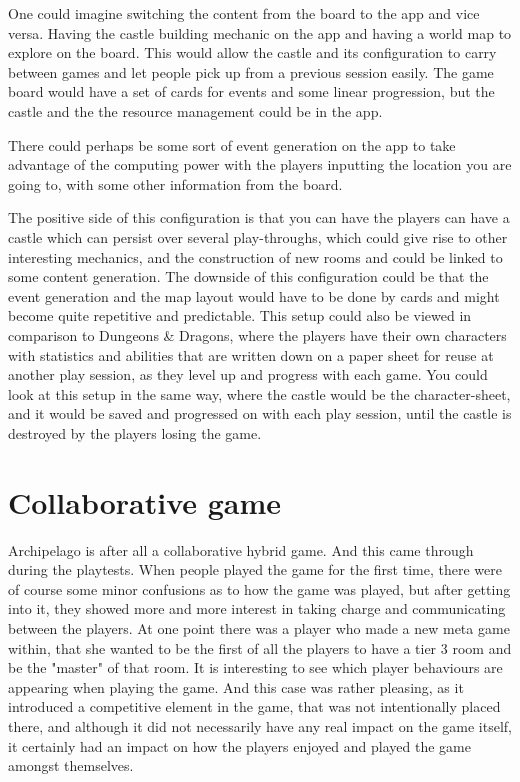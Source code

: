 One could imagine switching the content from the board to the app and vice versa. Having the castle building mechanic on the app and having a world map to explore on the board.
This would allow the castle and its configuration to carry between games and let people pick up from a previous session easily. 
The game board would have a set of cards for events and some linear progression, but the castle and the the resource management could be in the app. 

There could perhaps be some sort of event generation on the app to take advantage of the computing power with the players inputting the location you are going to, with some other information from the board. 

The positive side of this configuration is that you can have the players can have a castle which can persist over several play-throughs, which could give rise to other interesting mechanics, and the construction of new rooms and could be linked to some content generation. 
The downside of this configuration could be that the event generation and the map layout would have to be done by cards and might become quite repetitive and predictable. This setup could also be viewed in comparison to Dungeons \& Dragons\cite{game:dnd}, where the players have their own characters with statistics and abilities that are written down on a paper sheet for reuse at another play session, as they level up and progress with each game. You could look at this setup in the same way, where the castle would be the character-sheet, and it would be saved and progressed on with each play session, until the castle is destroyed by the players losing the game.

\section{Collaborative game} 
Archipelago is after all a collaborative hybrid game. And this came through during the playtests. When people played the game for the first time, there were of course some minor confusions as to how the game was played, but after getting into it, they showed more and more interest in taking charge and communicating between the players. At one point there was a player who made a new meta game within, that she wanted to be the first of all the players to have a tier 3 room and be the "master" of that room. It is interesting to see which player behaviours are appearing when playing the game. And this case was rather pleasing, as it introduced a competitive element in the game, that was not intentionally placed there, and although it did not necessarily have any real impact on the game itself, it certainly had an impact on how the players enjoyed and played the game amongst themselves.
